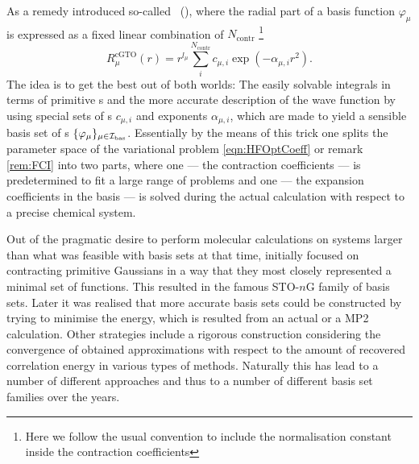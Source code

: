 As a remedy \citet{Hehre1969} introduced so-called
~(\cGTO),
where the radial part of a basis function $\varphi_\mu$
is expressed as a fixed linear combination of $N_\text{contr}$
%
\footnote{Here we follow the usual convention to include the normalisation constant
	inside the contraction coefficients}
\[ R^\text{cGTO}_\mu(r) = r^{l_\mu} \sum_i^{N_\text{contr}} c_{\mu,i} \exp(-\alpha_{\mu,i} r^2). \]
The idea is to get the best out of both worlds:
The easily solvable integrals in terms of primitive {\GTO}s
and the more accurate description of the wave function by using
special sets of s
$c_{\mu,i}$ and exponents $\alpha_{\mu,i}$,
which are made to yield
a sensible basis set of {\cGTO}s $\{\varphi_\mu\}_{\mu\in\mathcal{I}_\text{bas}}$.
Essentially by the means of this trick
one splits the parameter space of the variational problem
\eqref{eqn:HFOptCoeff} or remark \ref{rem:FCI}
into two parts,
where one --- the contraction coefficients ---
is predetermined to fit a large range of problems
and one --- the expansion coefficients in the basis ---
is solved during the actual calculation with respect to a precise
chemical system.

Out of the pragmatic desire to perform molecular calculations
on systems larger than what was feasible with \STO basis sets at that time,
\citet{Hehre1969} initially focused on contracting primitive Gaussians
in a way that they most closely represented a minimal set of \STO functions.
This resulted in the famous STO-$n$G family of basis sets.
Later it was realised that more accurate basis sets could be constructed
by trying to minimise the energy,
which is resulted from an actual \HF or a MP2 calculation.
Other strategies include a rigorous construction
considering the convergence of obtained approximations
with respect to the amount of recovered correlation energy
in various types of methods.
Naturally this has lead to a number of different approaches
and thus to a number of different basis set families over the years.

